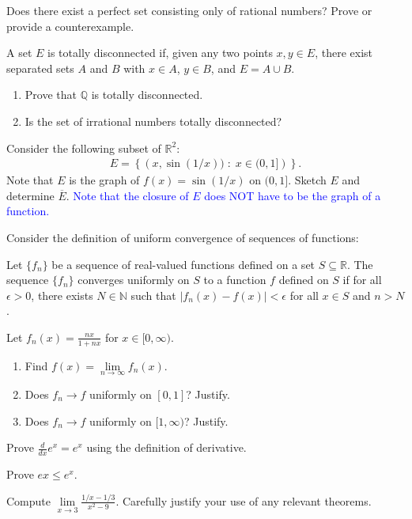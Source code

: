 \documentclass{ximera}
\begin{document}
\begin{exercise}
    Does there exist a perfect set consisting only of rational numbers?  Prove or provide a counterexample.
\end{exercise}

\begin{exercise}
    A set $E$ is totally disconnected if, given any two points $x,y \in E$, there exist separated sets $A$ and $B$ with $x \in A$, $y \in B$, and $ E = A \cup B$.
    \begin{enumerate}
        \item Prove that $\mathbb{Q}$ is totally disconnected.
        \item Is the set of irrational numbers totally disconnected?
    \end{enumerate}
\end{exercise}

\begin{exercise}
    Consider the following subset of $\mathbb{R}^2$:
    \begin{align*}
        E = \left\{ \left(x, \sin(1/x)) \; : \; x \in (0,1]\right)\right\}.
    \end{align*}
    Note that $E$ is the graph of $f(x) = \sin(1/x)$ on $(0,1]$.  Sketch $E$ and determine $\overline{E}$.  \textcolor{blue}{Note that the closure of $E$ does NOT have to be the graph of a function.}
\end{exercise}

Consider the definition of uniform convergence of sequences of functions:
\begin{definition}
    Let $\{f_n\}$ be a sequence of real-valued functions defined on a set $S \subseteq \mathbb{R}$.  The sequence $\{f_n\}$ converges uniformly on $S$ to a function $f$ defined on $S$ if for all $\epsilon > 0$, there exists $N \in \mathbb{N}$ such that $|f_n(x) - f(x)| < \epsilon $ for all $x \in S$ and $n > N$.
\end{definition}
\begin{exercise}
    Let $f_n(x) = \frac{nx}{1+nx}$ for $x \in [0,\infty)$.
    \begin{enumerate}
        \item Find $f(x) = \lim\limits_{n\to \infty} f_n(x)$.
        \item Does $f_n \to f$ uniformly on $[0,1]$?  Justify.
        \item Does $f_n \to f$ uniformly on $[1,\infty)$?  Justify.
    \end{enumerate}
\end{exercise}

\begin{exercise}
    Prove $\frac{d}{dx} e^x = e^x$ using the definition of derivative.
\end{exercise}

\begin{exercise}
    Prove $ex \leq e^x$.
\end{exercise}

\begin{exercise}
    Compute $\lim\limits_{x\to 3} \frac{1/x-1/3}{x^2-9}$.  Carefully justify your use of any relevant theorems.
\end{exercise}
\end{document}
